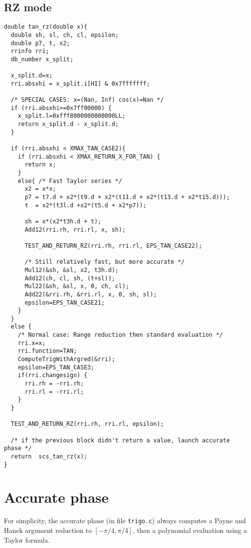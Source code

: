 \subsection{RZ mode}
\begin{lstlisting}[caption={Exceptional cases for tangent RZ},firstnumber=1]
double tan_rz(double x){  
  double sh, sl, ch, cl, epsilon;
  double p7, t, x2;
  rrinfo rri;
  db_number x_split;

  x_split.d=x;
  rri.absxhi = x_split.i[HI] & 0x7fffffff;
  
  /* SPECIAL CASES: x=(Nan, Inf) cos(x)=Nan */
  if (rri.absxhi>=0x7ff00000) {
    x_split.l=0xfff8000000000000LL;
    return x_split.d - x_split.d;
  }   
  
  if (rri.absxhi < XMAX_TAN_CASE2){
    if (rri.absxhi < XMAX_RETURN_X_FOR_TAN) {
      return x;
    }
    else{ /* Fast Taylor series */
      x2 = x*x;
      p7 = t7.d + x2*(t9.d + x2*(t11.d + x2*(t13.d + x2*t15.d)));
      t  = x2*(t3l.d +x2*(t5.d + x2*p7));
      
      sh = x*(x2*t3h.d + t);
      Add12(rri.rh, rri.rl, x, sh);   
      
      TEST_AND_RETURN_RZ(rri.rh, rri.rl, EPS_TAN_CASE22);

      /* Still relatively fast, but more accurate */
      Mul12(&sh, &sl, x2, t3h.d);
      Add12(ch, cl, sh, (t+sl));
      Mul22(&sh, &sl, x, 0, ch, cl);
      Add22(&rri.rh, &rri.rl, x, 0, sh, sl);
      epsilon=EPS_TAN_CASE21; 
    }
  }
  else { 
    /* Normal case: Range reduction then standard evaluation */
    rri.x=x;
    rri.function=TAN;
    ComputeTrigWithArgred(&rri);
    epsilon=EPS_TAN_CASE3; 
    if(rri.changesign) {
      rri.rh = -rri.rh; 
      rri.rl = -rri.rl;
    }
  }

  TEST_AND_RETURN_RZ(rri.rh, rri.rl, epsilon);

  /* if the previous block didn't return a value, launch accurate phase */
  return  scs_tan_rz(x); 
}
\end{lstlisting}

 


\section{Accurate phase}

For simplicity, the accurate phase (in file \texttt{trigo.c}) always
computes a Payne and Hanek argument reduction to $[-\pi/4, \pi/4]$,
then a polynomial evaluation using a Taylor formula.

